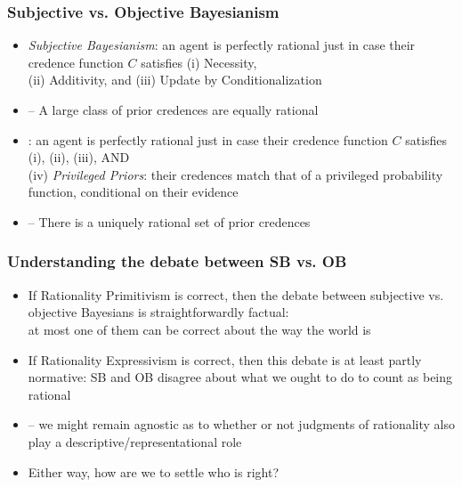 \begin{frame}
\frametitle{Subjective vs. Objective Bayesianism}

\begin{itemize}[<+->]

\item \emph{Subjective Bayesianism}: an agent is perfectly rational just in case their credence function $C$ satisfies (i) Necessity, \\ (ii) Additivity, and (iii) Update by Conditionalization

\item[] -- A large class of prior credences are equally rational

\item  {}: an agent is perfectly rational just in case their credence function $C$ satisfies (i), (ii), (iii), AND \\ (iv) \textit{Privileged Priors}: their credences match that of a privileged probability function, conditional on their evidence

\item[] -- There is a uniquely rational set of prior credences

\end{itemize}
\end{frame}

\begin{frame}
\frametitle{Understanding the debate between SB vs. OB}

\begin{itemize}[<+->]

\item If Rationality Primitivism is correct, then the debate between subjective vs. objective Bayesians is straightforwardly factual: \\ at most one of them can be correct about the way the world is

\item If Rationality Expressivism is correct, then this debate is at least partly normative: SB and OB disagree about what we ought to do to count as being rational 

\item -- we might remain agnostic as to whether or not judgments of rationality also play a descriptive/representational role 

\item Either way, how are we to settle who is right?


\end{itemize}
\end{frame}

